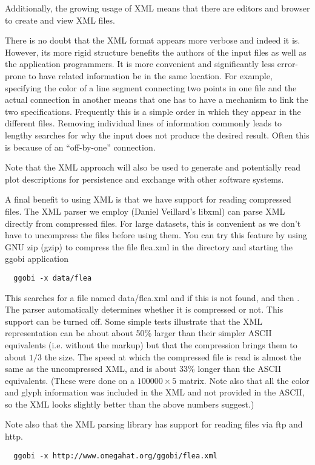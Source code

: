 \documentclass{article}
\def\directory#1{\dir{#1}}
\begin{document}
Additionally, the growing usage of XML means that there are editors
and browser to create and view XML files.

There is no doubt that the XML format appears more verbose and indeed
it is. However, its more rigid structure benefits the authors of the
input files as well as the application programmers.  It is more
convenient and significantly less error-prone to have related
information be in the same location.  For example, specifying the
color of a line segment connecting two points in one file and the
actual connection in another means that one has to have a mechanism to
link the two specifications. Frequently this is a simple order in
which they appear in the different files.  Removing individual lines
of information commonly leads to lengthy searches for why the input
does not produce the desired result.  Often this is because of an
``off-by-one'' connection.


Note that the XML approach will also be used to generate and
potentially read plot descriptions for persistence and exchange with
other software systems.


A final benefit to using XML is that we have support for reading
compressed files.  The XML parser we employ (Daniel Veillard's libxml)
can parse XML directly from compressed files.  For large datasets,
this is convenient as we don't have to uncompress the files before
using them.  You can try this feature by using GNU zip (gzip)
to compress the file flea.xml in the \directory{data}
directory and starting the ggobi application
\begin{verbatim}
  ggobi -x data/flea
\end{verbatim}
This searches for a file named data/flea.xml and if this is not found,
 and then .  The parser
automatically determines whether it is compressed or not.  This
support can be turned off.  Some simple tests illustrate that the XML
representation can be about about 50\% larger than their simpler ASCII
equivalents (i.e. without the markup) but that the compression brings
them to about $1/3$ the size. The speed at which the compressed file
is read is almost the same as the uncompressed XML, and is about 33\%
longer than the ASCII equivalents. (These were done on a $100000
\times 5$ matrix.  Note also that all the color and glyph information
was included in the XML and not provided in the ASCII, so the XML
looks slightly better than the above numbers suggest.)

Note also that the XML parsing library has support for reading files
via ftp and http.
\begin{verbatim}
  ggobi -x http://www.omegahat.org/ggobi/flea.xml
\end{verbatim}
\end{document}
